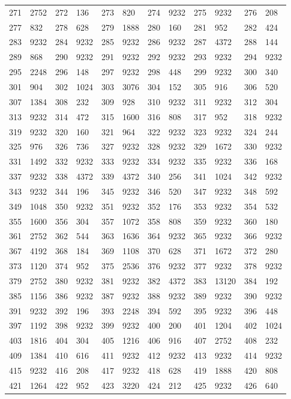 \begin{longtable}{llllllllllll}
271 & 2752&272 &136&273& 820&274 &9232&275 &9232&276& 208\\
277 & 832&278 &628&279& 1888&280 &160&281 &952&282& 424\\
283 & 9232&284 &9232&285& 9232&286 &9232&287 &4372&288& 144\\
289 & 868&290 &9232&291& 9232&292 &9232&293 &9232&294& 9232\\
295 & 2248&296 &148&297& 9232&298 &448&299 &9232&300& 340\\
301 & 904&302 &1024&303& 3076&304 &152&305 &916&306& 520\\
307 & 1384&308 &232&309& 928&310 &9232&311 &9232&312& 304\\
313 & 9232&314 &472&315& 1600&316 &808&317 &952&318& 9232\\
319 & 9232&320 &160&321& 964&322 &9232&323 &9232&324& 244\\
325 & 976&326 &736&327& 9232&328 &9232&329 &1672&330& 9232\\
331 & 1492&332 &9232&333& 9232&334 &9232&335 &9232&336& 168\\
337 & 9232&338 &4372&339& 4372&340 &256&341 &1024&342& 9232\\
343 & 9232&344 &196&345& 9232&346 &520&347 &9232&348& 592\\
349 & 1048&350 &9232&351& 9232&352 &176&353 &9232&354& 532\\
355 & 1600&356 &304&357& 1072&358 &808&359 &9232&360& 180\\
361 & 2752&362 &544&363& 1636&364 &9232&365 &9232&366& 9232\\
367 & 4192&368 &184&369& 1108&370 &628&371 &1672&372& 280\\
373 & 1120&374 &952&375& 2536&376 &9232&377 &9232&378& 9232\\
379 & 2752&380 &9232&381& 9232&382 &4372&383 &13120&384& 192\\
385 & 1156&386 &9232&387& 9232&388 &9232&389 &9232&390& 9232\\
391 & 9232&392 &196&393& 2248&394 &592&395 &9232&396& 448\\
397 & 1192&398 &9232&399& 9232&400 &200&401 &1204&402& 1024\\
403 & 1816&404 &304&405& 1216&406 &916&407 &2752&408& 232\\
409 & 1384&410 &616&411& 9232&412 &9232&413 &9232&414& 9232\\
415 & 9232&416 &208&417& 9232&418 &628&419 &1888&420& 808\\
421 & 1264&422 &952&423& 3220&424 &212&425 &9232&426& 640\\

\end{longtable}
